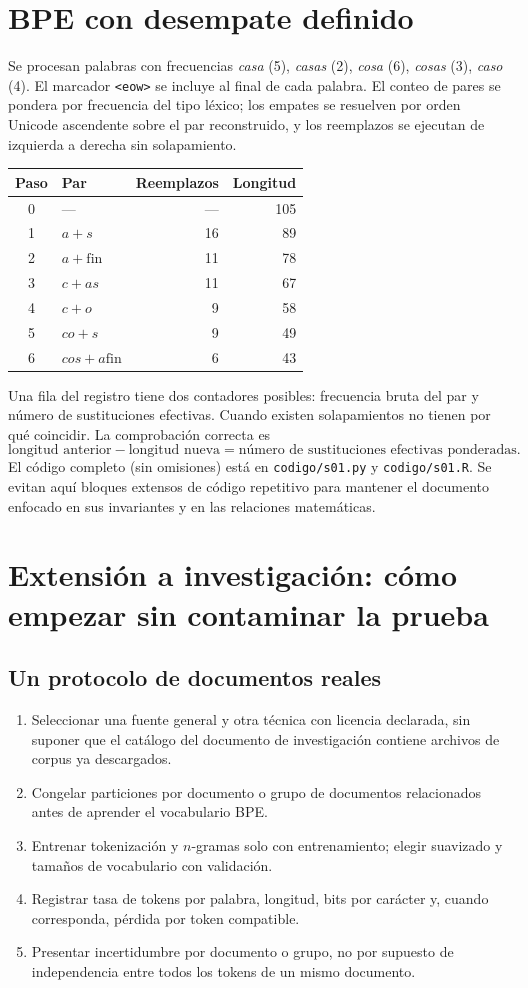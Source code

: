 \chapter{BPE con desempate definido}
Se procesan palabras con frecuencias
\emph{casa} (5), \emph{casas} (2), \emph{cosa} (6),
\emph{cosas} (3), \emph{caso} (4).
El marcador \texttt{<eow>} se incluye al final de cada palabra.
El conteo de pares se pondera por frecuencia del tipo léxico;
los empates se resuelven por orden Unicode ascendente sobre el par
reconstruido, y los reemplazos se ejecutan de izquierda a derecha
sin solapamiento.
\begin{center}\small
\begin{tabular}{clrr}\toprule Paso & Par & Reemplazos & Longitud\\\midrule
0&---&---&105\\1&$a+s$&16&89\\2&$a+\mathrm{fin}$&11&78\\
3&$c+as$&11&67\\4&$c+o$&9&58\\5&$co+s$&9&49\\
6&$cos+a\mathrm{fin}$&6&43\\\bottomrule
\end{tabular}
\end{center}
Una fila del registro tiene dos contadores posibles: frecuencia bruta
del par y número de sustituciones efectivas. Cuando existen
solapamientos no tienen por qué coincidir. La comprobación correcta es
\[
\text{longitud anterior}-\text{longitud nueva}
=\text{número de sustituciones efectivas ponderadas}.
\]
El código completo (sin omisiones) está en
\texttt{codigo/s01.py} y \texttt{codigo/s01.R}. Se evitan aquí bloques
extensos de código repetitivo para mantener el documento enfocado en
sus invariantes y en las relaciones matemáticas.
\chapter{Extensión a investigación: cómo empezar sin contaminar la prueba}
\section{Un protocolo de documentos reales}
\begin{enumerate}
\item Seleccionar una fuente general y otra técnica con licencia declarada,
sin suponer que el catálogo del documento de investigación contiene
archivos de corpus ya descargados.
\item Congelar particiones por documento o grupo de documentos relacionados
antes de aprender el vocabulario BPE.
\item Entrenar tokenización y $n$-gramas solo con entrenamiento;
elegir suavizado y tamaños de vocabulario con validación.
\item Registrar tasa de tokens por palabra, longitud, bits por carácter
y, cuando corresponda, pérdida por token compatible.
\item Presentar incertidumbre por documento o grupo, no por supuesto de
independencia entre todos los tokens de un mismo documento.
\end{enumerate}
